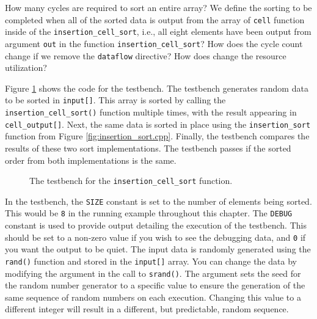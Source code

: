 \begin{exercise}
How many cycles are required to sort an entire array? We define the sorting to be completed when all of the sorted data is output from the array of \lstinline{cell} function inside of the \lstinline{insertion_cell_sort}, i.e., all eight elements have been output from argument \lstinline{out} in the function \lstinline{insertion_cell_sort}? How does the cycle count change if we remove the \lstinline{dataflow} directive? How does change the resource utilization?
\end{exercise}

Figure \ref{fig:insertion_cell_sort_test.cpp} shows the code for the testbench. The testbench generates random data to be sorted in \lstinline{input[]}. This array is sorted by calling the \lstinline{insertion_cell_sort()} function multiple times, with the result appearing in \lstinline{cell_output[]}. Next, the same data is sorted in place using the \lstinline{insertion_sort} function from Figure \ref{fig:insertion_sort.cpp}. Finally, the testbench compares the results of these two sort implementations. The testbench passes if the sorted order from both implementations is the same.

\begin{figure}
\footnotesize
%
\caption{  The testbench for the \lstinline{insertion_cell_sort} function. }
\label{fig:insertion_cell_sort_test.cpp}
\end{figure}

In the testbench, the \lstinline{SIZE} constant is set to the number of elements being sorted. This would be \lstinline{8} in the running example throughout this chapter. The \lstinline{DEBUG} constant is used to provide output detailing the execution of the testbench. This should be set to a non-zero value if you wish to see the debugging data, and \lstinline{0} if you want the output to be quiet. The input data is randomly generated using the \lstinline{rand()} function and stored in the \lstinline{input[]} array. You can change the data by modifying the argument in the call to \lstinline{srand()}.  The argument sets the seed for the random number generator to a specific value to ensure the generation of the same sequence of random numbers on each execution.  Changing this value to a different integer will result in a different, but predictable, random sequence.

